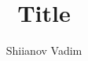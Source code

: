 \documentclass{article}
\begin{document}
\title{Title}
\author{Shiianov Vadim}
\maketitle
\end{document}
